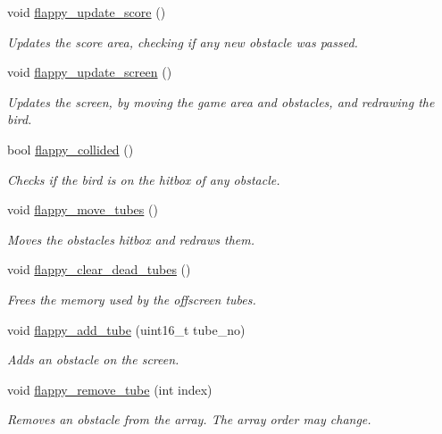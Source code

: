 \begin{DoxyCompactItemize}
void \mbox{\hyperlink{group__flappy_gaa49e826d675bb2a5271332a23831fcd1}{flappy\+\_\+update\+\_\+score}} ()
\begin{DoxyCompactList}\small\item\em Updates the score area, checking if any new obstacle was passed. \end{DoxyCompactList}\item 
void \mbox{\hyperlink{group__flappy_gaf8e964390506e60ce524b539e98ff4fc}{flappy\+\_\+update\+\_\+screen}} ()
\begin{DoxyCompactList}\small\item\em Updates the screen, by moving the game area and obstacles, and redrawing the bird. \end{DoxyCompactList}\item 
bool \mbox{\hyperlink{group__flappy_ga2b239332f6f259b99e59203e1ae3de43}{flappy\+\_\+collided}} ()
\begin{DoxyCompactList}\small\item\em Checks if the bird is on the hitbox of any obstacle. \end{DoxyCompactList}\item 
void \mbox{\hyperlink{group__flappy_gaa9297621f8ee414c88d82528044d564e}{flappy\+\_\+move\+\_\+tubes}} ()
\begin{DoxyCompactList}\small\item\em Moves the obstacles hitbox and redraws them. \end{DoxyCompactList}\item 
void \mbox{\hyperlink{group__flappy_gac459c993f010cd477b1cff328d2e6ce4}{flappy\+\_\+clear\+\_\+dead\+\_\+tubes}} ()
\begin{DoxyCompactList}\small\item\em Frees the memory used by the offscreen tubes. \end{DoxyCompactList}\item 
void \mbox{\hyperlink{group__flappy_ga0ae0e6cba690a1cba3a4514879eb1987}{flappy\+\_\+add\+\_\+tube}} (uint16\+\_\+t tube\+\_\+no)
\begin{DoxyCompactList}\small\item\em Adds an obstacle on the screen. \end{DoxyCompactList}\item 
void \mbox{\hyperlink{group__flappy_ga674a35d4936f4ab784c85addd4b4b830}{flappy\+\_\+remove\+\_\+tube}} (int index)
\begin{DoxyCompactList}\small\item\em Removes an obstacle from the array. The array order may change. \end{DoxyCompactList}\item 

\end{DoxyCompactItemize}
